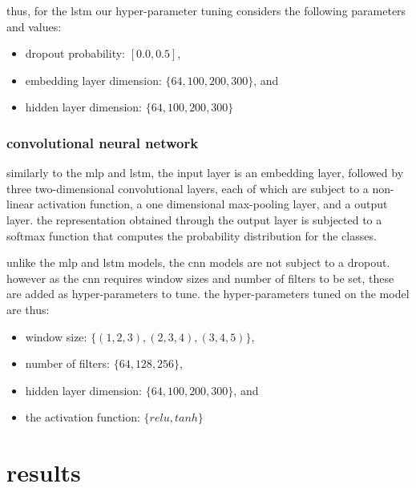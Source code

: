 thus, for the lstm our hyper-parameter tuning considers the following parameters and values:

\begin{itemize}
  \item dropout probability: $[0.0, 0.5]$,
  \item embedding layer dimension: $\{64, 100, 200, 300\}$, and
  \item hidden layer dimension: $\{64, 100, 200, 300\}$
\end{itemize}

\subsubsection{convolutional neural network}
similarly to the mlp and lstm, the input layer is an embedding layer, followed by three two-dimensional convolutional layers, each of which are subject to a non-linear activation function, a one dimensional max-pooling layer, and a output layer. 
the representation obtained through the output layer is subjected to a softmax function that computes the probability distribution for the classes.


unlike the mlp and lstm models, the cnn models are not subject to a dropout.
however as the cnn requires window sizes and number of filters to be set, these are added as hyper-parameters to tune. the hyper-parameters tuned on the model are thus:

\begin{itemize}
  \item window size: $\{(1, 2, 3), (2, 3, 4), (3, 4, 5)\}$,
  \item number of filters: $\{64, 128, 256\}$,
  \item hidden layer dimension: $\{64, 100, 200, 300\}$, and
  \item the activation function: $\{relu, tanh\}$
\end{itemize}

\section{results}

